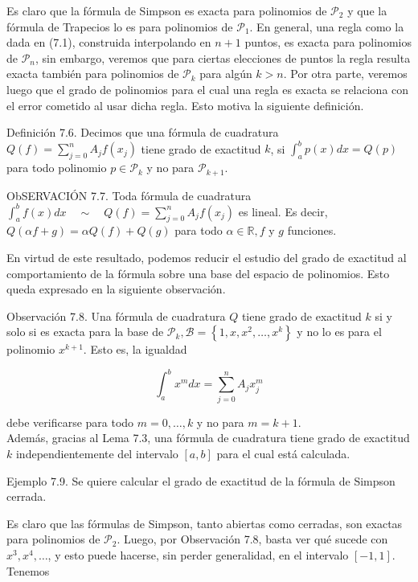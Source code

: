 \documentclass[10pt]{book}
\begin{document}
Es claro que la fórmula de Simpson es exacta para polinomios de $\mathcal{P}_{2}$ y que la fórmula de Trapecios lo es para polinomios de $\mathcal{P}_{1}$. En general, una regla como la dada en (7.1), construida interpolando en $n+1$ puntos, es exacta para polinomios de $\mathcal{P}_{n}$, sin embargo, veremos que para ciertas elecciones de puntos la regla resulta exacta también para polinomios de $\mathcal{P}_{k}$ para algún $k>n$. Por otra parte, veremos luego que el grado de polinomios para el cual una regla es exacta se relaciona con el error cometido al usar dicha regla. Esto motiva la siguiente definición.

Definición 7.6. Decimos que una fórmula de cuadratura $Q(f)=\sum_{j=0}^{n} A_{j} f\left(x_{j}\right)$ tiene grado de exactitud $k$, si $\int_{a}^{b} p(x) d x=Q(p)$ para todo polinomio $p \in \mathcal{P}_{k}$ y no para $\mathcal{P}_{k+1}$.

ObSERVACIÓN 7.7. Toda fórmula de cuadratura $\int_{a}^{b} f(x) d x \quad \sim \quad Q(f)=\sum_{j=0}^{n} A_{j} f\left(x_{j}\right)$ es lineal. Es decir, $Q(\alpha f+g)=\alpha Q(f)+Q(g)$ para todo $\alpha \in \mathbb{R}, f$ y $g$ funciones.

En virtud de este resultado, podemos reducir el estudio del grado de exactitud al comportamiento de la fórmula sobre una base del espacio de polinomios. Esto queda expresado en la siguiente observación.

Observación 7.8. Una fórmula de cuadratura $Q$ tiene grado de exactitud $k$ si y solo si es exacta para la base de $\mathcal{P}_{k}, \mathcal{B}=\left\{1, x, x^{2}, \ldots, x^{k}\right\}$ y no lo es para el polinomio $x^{k+1}$. Esto es, la igualdad

$$
\int_{a}^{b} x^{m} d x=\sum_{j=0}^{n} A_{j} x_{j}^{m}
$$

debe verificarse para todo $m=0, \ldots, k$ y no para $m=k+1$.\\
Además, gracias al Lema 7.3, una fórmula de cuadratura tiene grado de exactitud $k$ independientemente del intervalo $[a, b]$ para el cual está calculada.

Ejemplo 7.9. Se quiere calcular el grado de exactitud de la fórmula de Simpson cerrada.

Es claro que las fórmulas de Simpson, tanto abiertas como cerradas, son exactas para polinomios de $\mathcal{P}_{2}$. Luego, por Observación 7.8, basta ver qué sucede con $x^{3}, x^{4}, \ldots$, y esto puede hacerse, sin perder generalidad, en el intervalo $[-1,1]$. Tenemos
\end{document}
